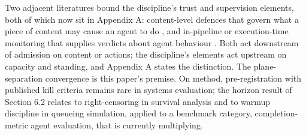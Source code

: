 Two adjacent literatures bound the discipline's trust and supervision elements, both of which now sit in Appendix A: content-level defences that govern what a piece of content may cause an agent to do \citep{camel2025,fides2025,rtbas2025,wallace2024,pact2026,provgates2026,cxi2026,memcurate2026}, and in-pipeline or execution-time monitoring that supplies verdicts about agent behaviour \citep{llamaguard2023,zou2024circuitbreakers,safetykernel2026,killbench2025}. Both act downstream of admission on content or actions; the discipline's elements act upstream on capacity and standing, and Appendix A states the distinction.
The plane-separation convergence \citep{mozilla2026,dynamo2025,aibrix2025,mars2026} is this paper's premise. On method, pre-registration with
published kill criteria remains rare in systems evaluation; the horizon
result of Section 6.2 relates to right-censoring in survival analysis and
to warmup discipline in queueing simulation, applied to a benchmark
category, completion-metric agent evaluation, that is currently
multiplying.
